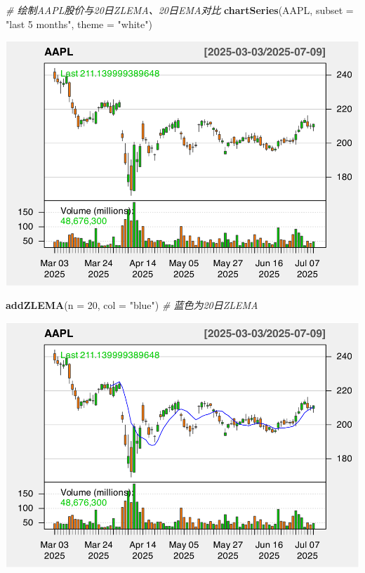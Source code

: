 \documentclass[]{ctexbook}
\newenvironment{Shaded}{\begin{snugshade}}{\end{snugshade}}
\newcommand{\AttributeTok}[1]{\textcolor[rgb]{0.13,0.29,0.53}{#1}}
\newcommand{\CommentTok}[1]{\textcolor[rgb]{0.56,0.35,0.01}{\textit{#1}}}
\newcommand{\DecValTok}[1]{\textcolor[rgb]{0.00,0.00,0.81}{#1}}
\newcommand{\FunctionTok}[1]{\textcolor[rgb]{0.13,0.29,0.53}{\textbf{#1}}}
\newcommand{\NormalTok}[1]{#1}
\newcommand{\StringTok}[1]{\textcolor[rgb]{0.31,0.60,0.02}{#1}}
\begin{document}
\begin{Shaded}
\begin{Highlighting}[]
\CommentTok{\# 绘制AAPL股价与20日ZLEMA、20日EMA对比}
\FunctionTok{chartSeries}\NormalTok{(AAPL, }\AttributeTok{subset =} \StringTok{"last 5 months"}\NormalTok{, }\AttributeTok{theme =} \StringTok{"white"}\NormalTok{)}
\end{Highlighting}
\end{Shaded}

\includegraphics[width=0.9\linewidth]{quantmod_files/figure-latex/zlema-1}

\begin{Shaded}
\begin{Highlighting}[]
\FunctionTok{addZLEMA}\NormalTok{(}\AttributeTok{n =} \DecValTok{20}\NormalTok{, }\AttributeTok{col =} \StringTok{"blue"}\NormalTok{)   }\CommentTok{\# 蓝色为20日ZLEMA}
\end{Highlighting}
\end{Shaded}

\includegraphics[width=0.9\linewidth]{quantmod_files/figure-latex/zlema-2}
\end{document}

